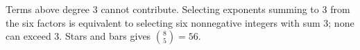 Terms above degree 3 cannot contribute. Selecting exponents summing to 3 from the six factors is equivalent to selecting six nonnegative integers with sum 3; none can exceed 3. Stars and bars gives $\binom85=\boxed{56}$.
